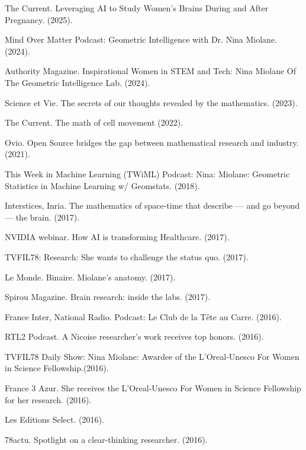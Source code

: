 The Current. Leveraging AI to Study Women’s Brains During and After Pregnancy. (2025).

Mind Over Matter Podcast: Geometric Intelligence with Dr. Nina Miolane. (2024).

Authority Magazine. Inspirational Women in STEM and Tech: Nina Miolane Of The Geometric Intelligence Lab. (2024).

Science et Vie. The secrets of our thoughts revealed by the mathematics. (2023).

The Current. The math of cell movement (2022).

Ovio. Open Source bridges the gap between mathematical research and industry. (2021).

This Week in Machine Learning (TWiML) Podcast: Nina: Miolane: Geometric Statistics in Machine Learning w/ Geomstats. (2018).

Interstices, Inria. The mathematics of space-time that describe — and go beyond — the brain. (2017).

NVIDIA webinar. How AI is transforming Healthcare. (2017).

TVFIL78: Research: She wants to challenge the status quo. (2017).

Le Monde. Binaire. Miolane’s anatomy. (2017).

Spirou Magazine. Brain research: inside the labs. (2017).

France Inter, National Radio. Podcast: Le Club de la Tête au Carre. (2016). 

RTL2 Podcast. A Nicoise researcher’s work receives top honors. (2016).

TVFIL78 Daily Show: Nina Miolane: Awardee of the L’Oreal-Unesco For Women in Science Fellowship.(2016).

France 3 Azur. She receives the L’Oreal-Unesco For Women in Science Fellowship for her research. (2016).

Les Editions Select. (2016).

78actu. Spotlight on a clear-thinking researcher. (2016).